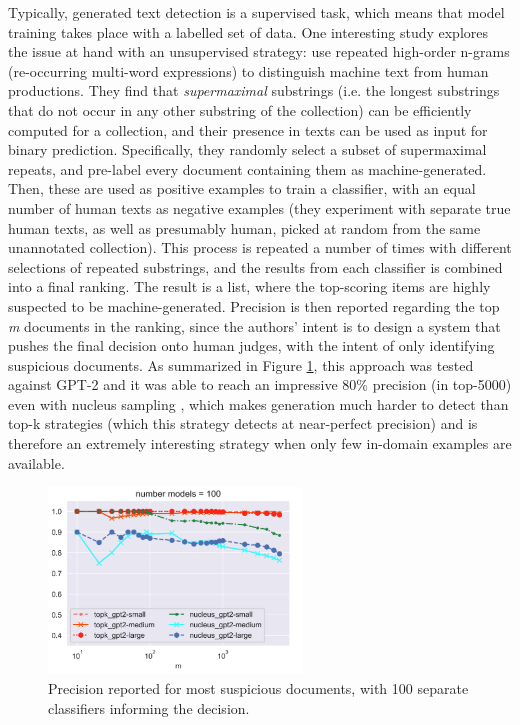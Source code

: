 Typically, generated text detection is a supervised task, which means that model training takes place with a labelled set of data.
One interesting study explores the issue at hand with an unsupervised strategy: \citet{galle2021unsupervised} use repeated high-order n-grams (re-occurring multi-word expressions) to distinguish machine text from human productions.
They find that \emph{supermaximal} substrings (i.e. the longest substrings that do not occur in any other substring of the collection) can be efficiently computed for a collection, and their presence in texts can be used as input for binary prediction.
Specifically, they randomly select a subset of supermaximal repeats, and pre-label every document containing them as machine-generated. Then, these are used as positive examples to train a classifier, with an equal number of human texts as negative examples (they experiment with separate true human texts, as well as presumably human, picked at random from the same unannotated collection).
This process is repeated a number of times with different selections of repeated substrings, and the results from each classifier is combined into a final ranking.
The result is a list, where the top-scoring items are highly suspected to be machine-generated.
Precision is then reported regarding the top \emph{m} documents in the ranking, since the authors' intent is to design a system that pushes the final decision onto human judges, with the intent of only identifying suspicious documents.
As summarized in Figure \ref{fig:galle2021_fig5_100models}, this approach was tested against GPT-2 and it was able to reach an impressive 80\% precision (in top-5000) even with nucleus sampling \citep{holtzman2019curious}, which makes generation much harder to detect than top-k strategies (which this strategy detects at near-perfect precision) and is therefore an extremely interesting strategy when only few in-domain examples are available.

\begin{figure}[h]
    \centering
    \includegraphics[width=0.6\textwidth]{assets/galle2021_fig5_100models.png}
    \caption{Precision reported for most suspicious documents, with 100 separate classifiers informing the decision.}
    \label{fig:galle2021_fig5_100models}
\end{figure}

